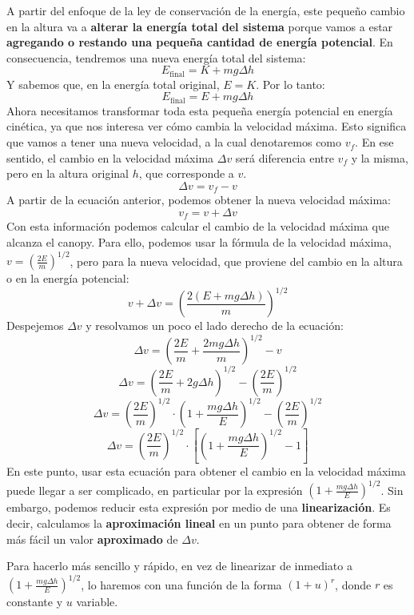 \documentclass[12pt]{article}
\begin{document}
A partir del enfoque de la ley de conservación de la energía, este pequeño cambio en la altura va a \textbf{alterar la energía total del sistema} porque vamos a estar \textbf{agregando o restando una pequeña cantidad de energía potencial}. En consecuencia, tendremos una nueva energía total del sistema:
\[E_{\text{final}} = K + mg\Delta h\]
Y sabemos que, en la energía total original, $E = K$. Por lo tanto:
\[E_{\text{final}} = E + mg\Delta h\]
Ahora necesitamos transformar toda esta pequeña energía potencial en energía cinética, ya que nos interesa ver cómo cambia la velocidad máxima. Esto significa que vamos a tener una nueva velocidad, a la cual denotaremos como $v_{f}$. En ese sentido, el cambio en la velocidad máxima $\Delta v$ será diferencia entre $v_{f}$ y la misma, pero en la altura original $h$, que corresponde a $v$.
\[\Delta v = v_{f} - v\]
A partir de la ecuación anterior, podemos obtener la nueva velocidad máxima:
\[v_{f} = v + \Delta v\]
Con esta información podemos calcular el cambio de la velocidad máxima que alcanza el canopy. Para ello, podemos usar la fórmula de la velocidad máxima, $v = \left(\frac{2E}{m}\right)^{1/2}$, pero para la nueva velocidad, que proviene del cambio en la altura o en la energía potencial:
\[v + \Delta v = \left(\frac{2(E + mg\Delta h)}{m}\right)^{1/2}\]
Despejemos $\Delta v$ y resolvamos un poco el lado derecho de la ecuación:
\[\Delta v = \left(\frac{2E}{m} + \frac{2mg\Delta h}{m}\right)^{1/2} - v\]
\[\Delta v = \left(\frac{2E}{m} + 2g\Delta h\right)^{1/2} - \left(\frac{2E}{m}\right)^{1/2}\]
\[\Delta v = \left(\frac{2E}{m}\right)^{1/2} \cdot \left(1 + \frac{mg \Delta h}{E}\right)^{1/2} - \left(\frac{2E}{m}\right)^{1/2}\]
\[\Delta v = \left(\frac{2E}{m}\right)^{1/2} \cdot \left[\left(1 + \frac{mg \Delta h}{E}\right)^{1/2} - 1 \right]\]
En este punto, usar esta ecuación para obtener el cambio en la velocidad máxima puede llegar a ser complicado, en particular por la expresión $\left(1 + \frac{mg \Delta h}{E}\right)^{1/2}$. Sin embargo, podemos reducir esta expresión por medio de una \textbf{linearización}. Es decir, calculamos la \textbf{aproximación lineal} en un punto para obtener de forma más fácil un valor \textbf{aproximado} de $\Delta v$.

Para hacerlo más sencillo y rápido, en vez de linearizar de inmediato  a $\left(1 + \frac{mg \Delta h}{E}\right)^{1/2}$, lo haremos con una función de la forma $(1 + u)^{r}$, donde $r$ es constante y $u$ variable.
\end{document}
